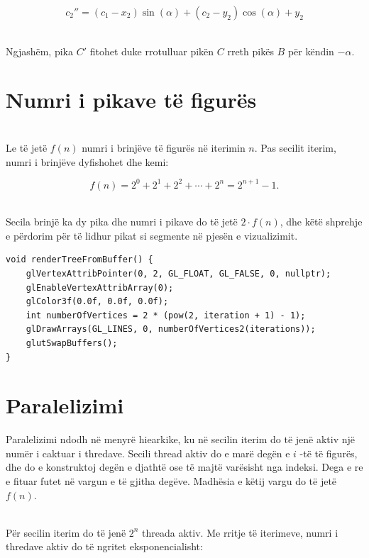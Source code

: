 \[
c_2'' = (c_1 - x_2) \sin(\alpha) + (c_2 - y_2) \cos(\alpha) + y_2
\]


\noindent \\ Ngjashëm, pika \( C' \) fitohet duke rrotulluar pikën \( C \) rreth pikës \( B \) për këndin \(-\alpha\).





\section{Numri i pikave të figurës}

\noindent \\ Le të jetë \( f(n) \) numri i brinjëve të figurës në iterimin \( n \). Pas secilit iterim, numri i brinjëve dyfishohet dhe kemi:

\[ f(n) = 2^0 + 2^1 + 2^2 + \cdots + 2^n = 2^{n+1} - 1. \]

\noindent \\ Secila brinjë ka dy pika dhe numri i pikave do të jetë \( 2 \cdot f(n) \), dhe këtë shprehje e përdorim për të lidhur pikat si segmente në pjesën e vizualizimit. \\

\begin{lstlisting}
void renderTreeFromBuffer() {
    glVertexAttribPointer(0, 2, GL_FLOAT, GL_FALSE, 0, nullptr);
    glEnableVertexAttribArray(0);
    glColor3f(0.0f, 0.0f, 0.0f);
    int numberOfVertices = 2 * (pow(2, iteration + 1) - 1);
    glDrawArrays(GL_LINES, 0, numberOfVertices2(iterations));
    glutSwapBuffers();	
}
\end{lstlisting}

\section{Paralelizimi}
\noindent Paralelizimi ndodh në menyrë hiearkike, ku në secilin iterim do të jenë aktiv një numër i caktuar i thredave. Secili thread aktiv do e marë degën  e \(i\) -të të figurës, dhe do e konstruktoj degën e djathtë ose të majtë varësisht nga indeksi. Dega e re e fituar futet në vargun e të gjitha degëve. Madhësia e këtij vargu do të jetë \( f(n) \).

\noindent \\ Për secilin iterim do të jenë \(2^n \) threada aktiv. Me rritje të iterimeve, numri i thredave aktiv do të  ngritet eksponencialisht: 

